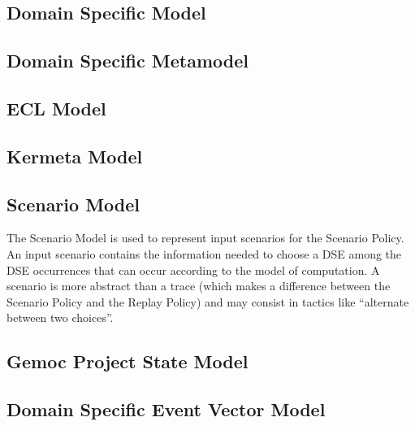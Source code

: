 \documentclass{gemoc} %
\begin{document}
\subsection{Domain Specific Model}


\subsection{Domain Specific Metamodel}


\subsection{ECL Model}


\subsection{Kermeta Model}


\subsection{Scenario Model}
The Scenario Model is used to represent input scenarios for the Scenario Policy. An input scenario contains the information needed to choose a DSE among the DSE occurrences that can occur according to the model of computation. A scenario is more abstract than a trace (which makes a difference between the Scenario Policy and the Replay Policy) and may consist in tactics like ``alternate between two choices''.

\subsection{Gemoc Project State Model}


\subsection{Domain Specific Event Vector Model}
\end{document}
